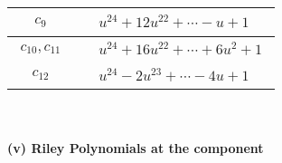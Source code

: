 \documentclass[1p]{elsarticle_modified}
\theoremstyle{definition}
\begin{document}
\begin{tabular}{m{50pt}|m{274pt}}
\hline $$\begin{aligned}c_{9}\end{aligned}$$&$\begin{aligned}
&u^{24}+12 u^{22}+\cdots- u+1
\end{aligned}$\\
\hline $$\begin{aligned}c_{10},c_{11}\end{aligned}$$&$\begin{aligned}
&u^{24}+16 u^{22}+\cdots+6 u^2+1
\end{aligned}$\\
\hline $$\begin{aligned}c_{12}\end{aligned}$$&$\begin{aligned}
&u^{24}-2 u^{23}+\cdots-4 u+1
\end{aligned}$\\
\hline
\end{tabular}\\~\\
\newpage\renewcommand{\arraystretch}{1}
\flushleft \textbf{(v) Riley Polynomials at the component}\newline \\
\end{document}
